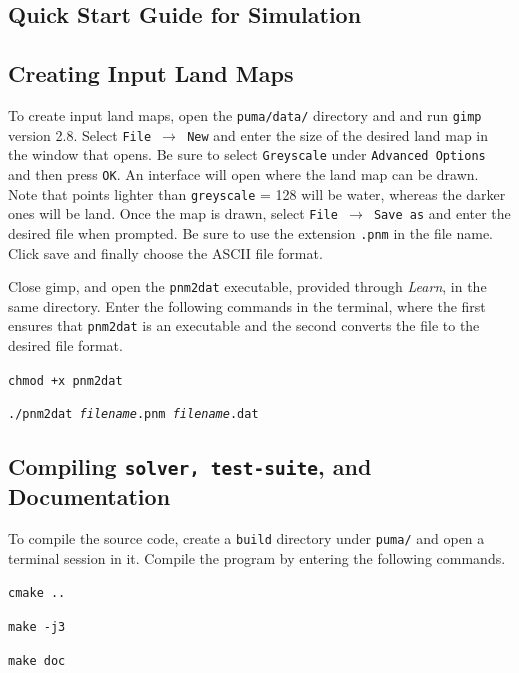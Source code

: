 \documentclass[a4paper,11pt]{article}
\begin{document}
\newpage
\begin{appendices}
\section{Quick Start Guide for Simulation }
\subsection{Creating Input Land Maps}

To create input land maps, open the \texttt{puma/data/} directory and and run \texttt{gimp} version 2.8. Select \texttt{File $\rightarrow$ New} and enter the size of the desired land map in the window that opens.  Be sure to select \texttt{Greyscale} under \texttt{Advanced Options} and then press \texttt{OK}. An interface will open where the land map can be drawn. Note that points lighter than \texttt{greyscale} = 128 will be water, whereas the darker ones will be land. Once the map is drawn, select \texttt{File $\rightarrow$ Save as} and enter the desired file when prompted.  Be sure to use the extension \texttt{.pnm} in the file name.  Click save and finally choose the ASCII file format.

Close gimp, and open the \texttt{pnm2dat} executable, provided through \textit{Learn}, in the same directory. Enter the following commands in the terminal, where the first ensures that \texttt{pnm2dat} is an executable and the second converts the file to the desired file format. 

\vspace{5pt}
\noindent \texttt{chmod +x pnm2dat}

\noindent \texttt{./pnm2dat \emph{filename}.pnm  \emph{filename}.dat}
\vspace{5pt}

\subsection{Compiling \texttt{solver, test-suite}, and Documentation}

To compile the source code, create a \texttt{build} directory under \texttt{puma/} and open a terminal session in it. Compile the program by entering the following commands.

\vspace{5pt}
\noindent \texttt{cmake ..}

\noindent \texttt{make -j3}

\noindent\texttt{make doc}
\vspace{5pt}


\end{appendices}
\end{document}
